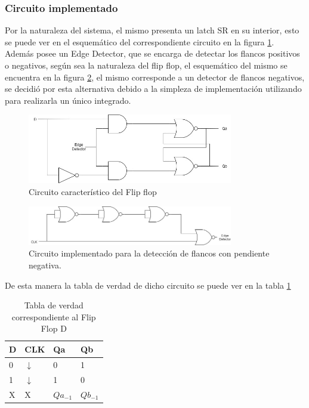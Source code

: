 \subsubsection{Circuito implementado}
\noindent
Por la naturaleza del sistema, el mismo presenta un latch SR en su interior, esto se puede ver en el esquemático del correspondiente circuito en la figura \ref{ej6_flip_flop_D}. Además posee un Edge Detector, que se encarga de detectar los flancos positivos o negativos, según sea la naturaleza del flip flop, el esquemático del mismo se encuentra en la figura \ref{ej6_flip_flop_D_edge}, el mismo corresponde a un detector de flancos negativos, se decidió por esta alternativa debido a la simpleza de implementación utilizando para realizarla un único integrado.
%
%
\begin{figure}[H]
    \centering
        \centering
        \includegraphics[width=0.8\textwidth]{figs/Ej6/flipflop.jpg} %
         \caption{Circuito característico del Flip flop}
         \label{ej6_flip_flop_D}
\end{figure}
%
\begin{figure}[H]
    \centering
        \centering
        \includegraphics[width=0.8\textwidth]{figs/Ej6/Edgedetetor.jpg} %
         \caption{Circuito implementado para la detección de flancos con pendiente negativa.}
         \label{ej6_flip_flop_D_edge}
\end{figure}
%
\noindent
De esta manera la tabla de verdad de dicho circuito se puede ver en la tabla \ref{ej6_tabla_flip_flop_D}
%
%
\begin{table}[H]
\caption{Tabla de verdad correspondiente al Flip Flop D}
\label{ej6_tabla_flip_flop_D}
\centering
\begin{tabular}{|l|l||l|l|}
\hline
D & CLK                     & Qa         & Qb         \\ \hline
0 & $\downarrow$ & 0          & 1          \\ \hline
1 & $\downarrow$ & 1          & 0          \\ \hline
X & X                       & $Qa_{-1}$ & $Qb_{-1}$ \\ \hline
\end{tabular}
\end{table}
